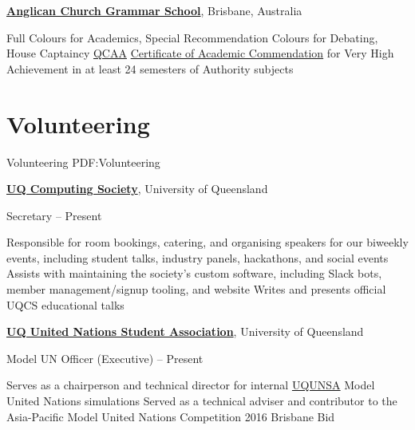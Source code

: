 \documentclass[a4paper,10pt,oneside]{article}
\begin{document}
\begin{body}
\EntryGap

\href{https://www.churchie.com.au/}{\textbf{Anglican Church Grammar School}}, Brisbane, Australia
\begin{detail}
\BulletItem Full Colours for Academics, Special Recommendation Colours for Debating, House Captaincy \hfill {}
\BulletItem \href{https://www.qcaa.qld.edu.au/}{QCAA} \href{https://www.qcaa.qld.edu.au/senior/certificates-qualifications/qce/qce-achievement-awards/certificate-academic-commendation/2014}{Certificate of Academic Commendation} for Very High Achievement in at least 24 semesters of Authority subjects \hfill {}
\end{detail}


\section
{Volunteering}
{Volunteering}
{PDF:Volunteering}

\href{https://uqcs.org.au/}
{\textbf{UQ Computing Society}}, University of Queensland

\par Secretary\hfill {} -- Present

\begin{detail}
\BulletItem Responsible for room bookings, catering, and organising speakers for our biweekly events, including student talks, industry panels, hackathons, and social events
\BulletItem Assists with maintaining the society's custom software, including Slack bots, member management/signup tooling, and website
\BulletItem Writes and presents official UQCS educational talks
\end{detail}

\EntryGap

\href{http://www.unsauq.org/}
{\textbf{UQ United Nations Student Association}}, University of Queensland

\par Model UN Officer (Executive)\hfill {} -- Present

\begin{detail}
\BulletItem Serves as a chairperson and technical director for internal \href{http://www.unsauq.org/}{UQUNSA} Model United Nations simulations 
\BulletItem Served as a technical adviser and contributor to the Asia-Pacific Model United Nations Competition 2016 Brisbane Bid
\end{detail}


\end{body}
\end{document}

